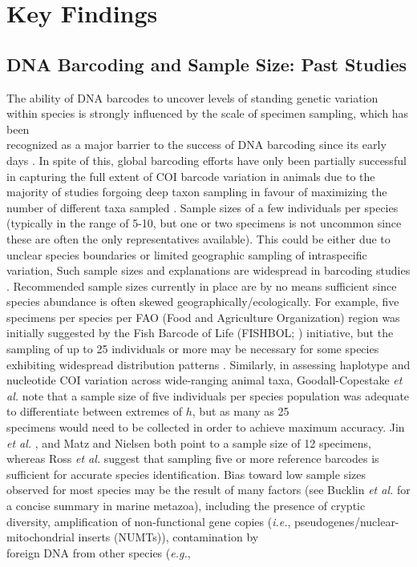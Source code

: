 \vspace{5mm}

\section{Key Findings}

\subsection{DNA Barcoding and Sample Size: Past Studies}

The ability of DNA barcodes to uncover levels of standing genetic variation within species is strongly influenced by the scale of specimen sampling, which has been \\ recognized as a major barrier to the success of DNA barcoding since its early days  \cite{hebert2004identification, meyer2005dna, ward2005dna}. In spite of this, global barcoding efforts have only been partially successful in capturing the full extent of COI barcode variation in animals due to the majority of studies forgoing deep taxon sampling in favour of maximizing the number of different taxa sampled \cite{matz2005likelihood, zhang2010estimating}. Sample sizes of a few individuals per species (typically in the range of 5-10, but one or two specimens is not uncommon since these are often the only representatives available). This could be either due to unclear species boundaries  or limited geographic sampling of intraspecific variation, Such sample sizes and explanations are widespread in barcoding studies \cite{hajibabaei2007dna, matz2005likelihood, zhang2010estimating}. Recommended sample sizes currently in place are by no means sufficient since species abundance is often skewed geographically/ecologically. For example, five specimens per species per FAO (Food and Agriculture Organization) region was initially suggested by the Fish Barcode of Life (FISHBOL; \cite{ward2009campaign}) initiative, but the sampling of up to 25 individuals or more may be necessary for some species exhibiting widespread distribution patterns \cite{becker2011five, steinke2011fish}. Similarly, in assessing haplotype and nucleotide COI variation across wide-ranging animal taxa, Goodall-Copestake \textit{et al.} \cite{goodall2012comparison} note that a sample size of five individuals per species population was adequate to differentiate between extremes of $h$, but as many as 25 \\ specimens would need to be collected in order to achieve maximum accuracy. Jin \textit{et al.} \cite{jin2012simple}, and Matz and Nielsen \cite{matz2005likelihood} both point to a sample size of 12 specimens, whereas Ross \textit{et al.} \cite{ross2008testing} suggest that sampling five or more reference barcodes is sufficient for accurate species identification. Bias toward low sample sizes observed for most species may be the result of many factors (see Bucklin \textit{et al.} \cite{bucklin2011dna} for a concise summary in marine metazoa), including the presence of cryptic diversity, amplification of non-functional gene copies (\textit{i.e.}, pseudogenes/nuclear-mitochondrial inserts (NUMTs)), contamination by \\ foreign DNA from other species (\textit{e.g.}, 